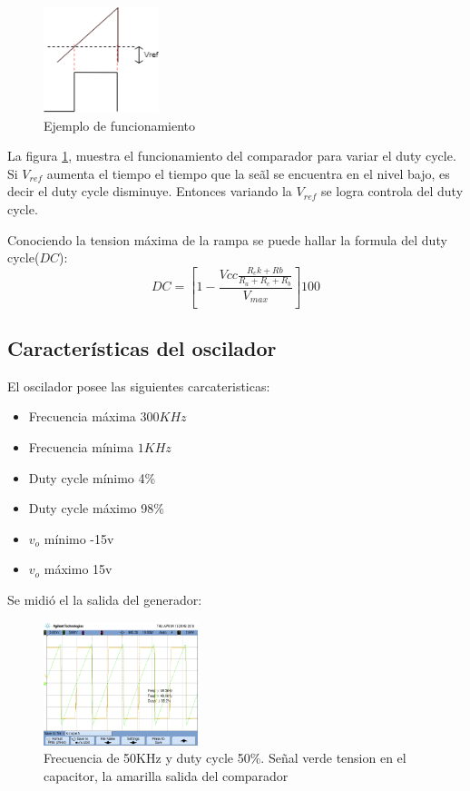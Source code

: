 \documentclass[../../ASSD_TP1_G7.tex]{subfiles}
\begin{document}
\begin{figure}[H]
\centering
\includegraphics[width=0.3\textwidth]{figures/r2sq.png}
\caption{Ejemplo de funcionamiento}\label{fig:ej}
\end{figure}

La figura \ref{fig:ej}, muestra el funcionamiento del comparador para variar el duty cycle. Si $V_{ref}$ aumenta el tiempo el tiempo que la se\~al se encuentra en el nivel bajo, es decir el duty cycle disminuye. Entonces variando la $V_{ref}$ se logra controla del duty cycle. 
\par Conociendo la tension máxima de la rampa se puede hallar la formula del duty cycle($DC$):
\begin{equation}
DC=\left[ 1 - \frac{Vcc \frac{R_ck + Rb}{R_a + R_c + R_b}}{V_{max}} \right] 100
\end{equation}

\subsection*{Características del oscilador}
El oscilador posee las siguientes carcateristicas:
\begin{itemize}
  \item Frecuencia máxima $300KHz$
  \item Frecuencia mínima $1KHz$
  \item Duty cycle mínimo 4\%
  \item Duty cycle máximo 98\%
  \item $v_o$ mínimo -15v
  \item $v_o$ máximo 15v

\end{itemize}
Se midió el la salida del generador:

\begin{figure}[H]
\centering
\includegraphics[width=0.4\textwidth]{figures/scope5.png}
\caption{Frecuencia de 50KHz y duty cycle 50\%. Se\~nal verde tension en el capacitor, la amarilla salida del comparador}
\end{figure}
\end{document}
